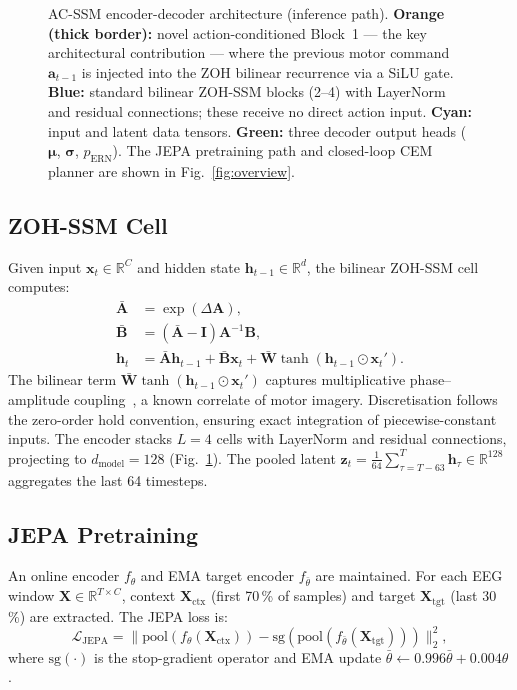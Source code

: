 \documentclass[journal]{IEEEtran}
\begin{document}
\begin{figure}[!t]
\begin{tikzpicture}
\end{tikzpicture}
\caption{AC-SSM encoder-decoder architecture (inference path).
\textbf{Orange (thick border):} novel action-conditioned Block~1 — the key
architectural contribution — where the previous motor command
$\mathbf{a}_{t-1}$ is injected into the ZOH bilinear recurrence via a SiLU
gate. \textbf{Blue:} standard bilinear ZOH-SSM blocks (2--4) with LayerNorm
and residual connections; these receive no direct action input.
\textbf{Cyan:} input and latent data tensors. \textbf{Green:} three decoder
output heads ($\bm\mu$, $\bm\sigma$, $p_\text{ERN}$). The JEPA pretraining
path and closed-loop CEM planner are shown in Fig.~\ref{fig:overview}.}
\label{fig:architecture}
\end{figure}

\subsection{ZOH-SSM Cell}
\label{sec:zoh}

Given input $\mathbf{x}_t \in \mathbb{R}^C$ and hidden state $\mathbf{h}_{t-1} \in \mathbb{R}^d$, the bilinear ZOH-SSM cell computes:
\begin{align}
  \bar{\mathbf{A}} &= \exp(\Delta \mathbf{A}),  \label{eq:zoh_A} \\
  \bar{\mathbf{B}} &= (\bar{\mathbf{A}} - \mathbf{I})\mathbf{A}^{-1}\mathbf{B}, \label{eq:zoh_B} \\
  \mathbf{h}_t &= \bar{\mathbf{A}}\mathbf{h}_{t-1} + \bar{\mathbf{B}}\mathbf{x}_t + \bar{\mathbf{W}}\tanh(\mathbf{h}_{t-1} \odot \mathbf{x}_t'). \label{eq:bilinear}
\end{align}
The bilinear term $\bar{\mathbf{W}}\tanh(\mathbf{h}_{t-1} \odot \mathbf{x}_t')$ captures multiplicative phase--amplitude coupling~\cite{canolty2010functional}, a known correlate of motor imagery.
Discretisation follows the zero-order hold convention, ensuring exact integration of piecewise-constant inputs.
The encoder stacks $L=4$ cells with LayerNorm and residual connections, projecting to $d_\text{model}=128$ (Fig.~\ref{fig:architecture}).
The pooled latent $\mathbf{z}_t = \frac{1}{64}\sum_{\tau=T-63}^{T} \mathbf{h}_\tau \in \mathbb{R}^{128}$ aggregates the last 64 timesteps.

\subsection{JEPA Pretraining}
\label{sec:jepa}

An online encoder $f_\theta$ and EMA target encoder $f_{\bar\theta}$ are maintained.
For each EEG window $\mathbf{X} \in \mathbb{R}^{T \times C}$, context $\mathbf{X}_\text{ctx}$ (first 70\,\% of samples) and target $\mathbf{X}_\text{tgt}$ (last 30\,\%) are extracted.
The JEPA loss is:
\begin{equation}
  \mathcal{L}_\text{JEPA} = \|\text{pool}(f_\theta(\mathbf{X}_\text{ctx})) - \text{sg}(\text{pool}(f_{\bar\theta}(\mathbf{X}_\text{tgt})))\|_2^2,
\end{equation}
where $\text{sg}(\cdot)$ is the stop-gradient operator and EMA update $\bar\theta \leftarrow 0.996\bar\theta + 0.004\theta$.
\end{document}
